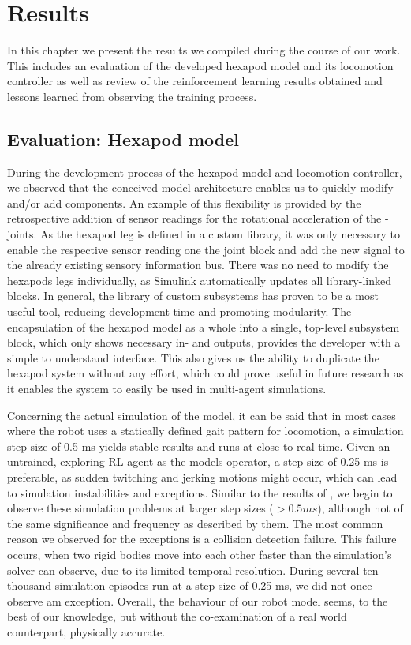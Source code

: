 \chapter{Results}
\label{ch:results}

In this chapter we present the results we compiled during the course of our work.
This includes an evaluation of the developed hexapod model and its locomotion controller as well as review of the reinforcement learning results obtained and lessons learned from observing the training process.

\section{Evaluation: Hexapod model}
During the development process of the hexapod model and locomotion controller, we observed that the conceived model architecture enables us to quickly modify and/or add components.
An example of this flexibility is provided by the retrospective addition of sensor readings for the rotational acceleration of the \textalpha-joints.
As the hexapod leg is defined in a custom library, it was only necessary to enable the respective sensor reading one the joint block and add the new signal to the already existing sensory information bus. 
There was no need to modify the hexapods legs individually, as Simulink automatically updates all library-linked blocks.
In general, the library of custom subsystems has proven to be a most useful tool, reducing development time and promoting modularity.
The encapsulation of the hexapod model as a whole into a single, top-level subsystem block, which only shows necessary in- and outputs, provides the developer with a simple to understand interface.
This also gives us the ability to duplicate the hexapod system without any effort, which could prove useful in future research as it enables the system to easily be used in multi-agent simulations.

Concerning the actual simulation of the model, it can be said that in most cases where the robot uses a statically defined gait pattern for locomotion, a simulation step size of 0.5 ms yields stable results and runs at close to real time.
Given an untrained, exploring RL agent as the models operator, a step size of 0.25 ms is preferable, as sudden twitching and jerking motions might occur, which can lead to simulation instabilities and exceptions.
Similar to the results of \cite{thilderkvist2015motion}, we begin to observe these simulation problems at larger step sizes ($> 0.5 ms$), although not of the same significance and frequency as described by them. 
The most common reason we observed for the exceptions is a collision detection failure.
This  failure occurs, when two rigid bodies move into each other faster than the simulation's solver can observe, due to its limited temporal resolution.
During several ten-thousand simulation episodes run at a step-size of 0.25 ms, we did not once observe am exception.
Overall, the behaviour of our robot model seems, to the best of our knowledge, but without the co-examination of a real world counterpart, physically accurate.


